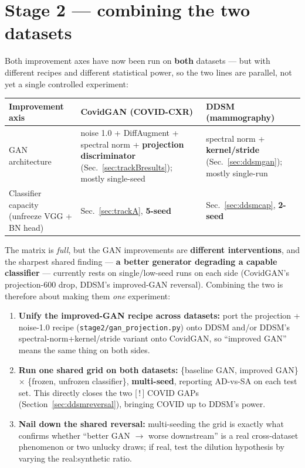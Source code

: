\documentclass[11pt]{article}
\newcommand{\code}[1]{\texttt{#1}}
\begin{document}
\section{Stage 2 --- combining the two datasets}
\label{sec:combine}

Both improvement axes have now been run on \textbf{both} datasets --- but with
different recipes and different statistical power, so the two lines are parallel, not
yet a single controlled experiment:

\begin{table}[htbp]
\centering\small
\begin{tabular}{@{}lp{5.4cm}p{5.0cm}@{}}
\toprule
\textbf{Improvement axis} & \textbf{CovidGAN (COVID-CXR)} & \textbf{DDSM (mammography)} \\
\midrule
GAN architecture & noise 1.0 + DiffAugment + spectral norm + \textbf{projection discriminator} (Sec.~\ref{sec:trackBresults}); mostly single-seed & spectral norm + \textbf{kernel/stride} (Sec.~\ref{sec:ddsmgan}); mostly single-run \\
\addlinespace
Classifier capacity (unfreeze VGG + BN head) & Sec.~\ref{sec:trackA}, \textbf{5-seed} & Sec.~\ref{sec:ddsmcap}, \textbf{2-seed} \\
\bottomrule
\end{tabular}
\end{table}

\noindent The matrix is \emph{full}, but the GAN improvements are \textbf{different
interventions}, and the sharpest shared finding --- \textbf{a better generator
degrading a capable classifier} --- currently rests on single/low-seed runs on each
side (CovidGAN's projection-600 drop, DDSM's improved-GAN reversal). Combining the two
is therefore about making them \emph{one} experiment:

\begin{enumerate}[nosep,leftmargin=1.6em]
  \item \textbf{Unify the improved-GAN recipe across datasets:} port the projection
        + noise-1.0 recipe (\code{stage2/gan\_projection.py}) onto DDSM and/or DDSM's
        spectral-norm+kernel/stride variant onto CovidGAN, so ``improved GAN'' means
        the same thing on both sides.
  \item \textbf{Run one shared grid on both datasets:} \{baseline GAN, improved GAN\}
        $\times$ \{frozen, unfrozen classifier\}, \textbf{multi-seed}, reporting
        AD-vs-SA on each test set. This directly closes the two [\,!\,] COVID GAPs
        (Section~\ref{sec:ddsmreversal}), bringing COVID up to DDSM's power.
  \item \textbf{Nail down the shared reversal:} multi-seeding the grid is exactly what
        confirms whether ``better GAN $\to$ worse downstream'' is a real cross-dataset
        phenomenon or two unlucky draws; if real, test the dilution hypothesis by
        varying the real:synthetic ratio.
\end{enumerate}
\end{document}
